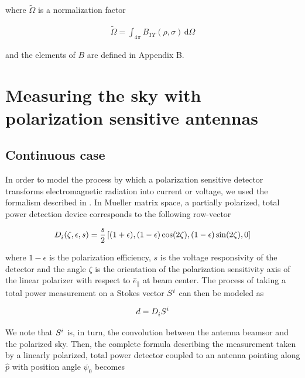 \documentclass[a4paper,11pt]{article}
\newcommand{\co}{\mathbin{\|}}
\begin{document}
\noindent
where $\tilde{\Omega}$ is a normalization factor

\begin{equation}
\begin{aligned}
\tilde{\Omega} = \int_{4\pi} B_{TT}(\rho,\sigma) \, \mathrm{d} \Omega
\end{aligned}
\end{equation}

\noindent
and the elements of $B$ are defined in Appendix B. 

\section{Measuring the sky with polarization sensitive antennas}

\subsection{Continuous case}

In order to model the process by which a polarization sensitive detector transforms electromagnetic radiation into current or voltage, we used the formalism described in \cite{2007A&A...470..771J}. In Mueller matrix space, a partially polarized, total power detection device corresponds to the following row-vector 

\begin{equation}
\begin{aligned}
\tensor{D}{_{i}}(\zeta,\epsilon,s) = \frac{s}{2} \left[(1 + \epsilon), (1 - \epsilon)\cos(2\zeta), (1 - \epsilon)\sin(2\zeta), 0 \right]
\end{aligned}
\label{eq::M_pol}
\end{equation}

\noindent
where $1 - \epsilon$ is the polarization efficiency, $s$ is the voltage responsivity of the detector and the angle $\zeta$ is the orientation of the polarization sensitivity axis of the linear polarizer with respect to $\hat{e}_{\co}$ at beam center. The process of taking a total power measurement on a Stokes vector $\tensor{S}{^{i}}$ can then be modeled as

\begin{equation}
\begin{aligned}
d = \tensor{D}{_{i}} \tensor{S}{^{i}}
\end{aligned}
\label{eq::total_power_measurement}
\end{equation}

We note that $\tensor{S}{^{i}}$ is, in turn, the convolution between the antenna beamsor and the polarized sky. Then, the complete formula describing the measurement taken by a linearly polarized, total power detector coupled to an antenna pointing along $\hat{p}$ with position angle $\psi_0$ becomes
\end{document}
